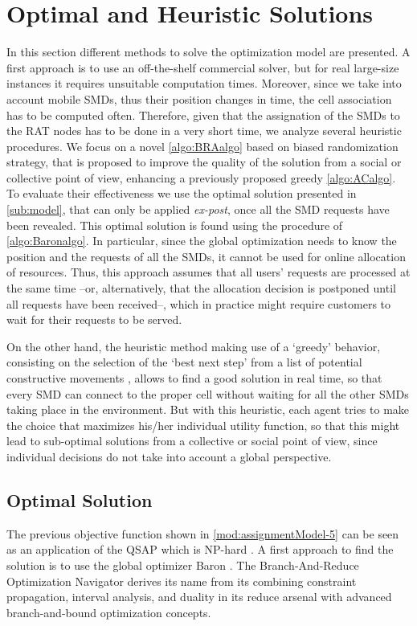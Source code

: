 \documentclass[twoside,openright]{report}
\begin{document}
\section{Optimal and Heuristic Solutions}
\label{sec:methodological_approach}
In this section different methods to solve the optimization model are presented. A first approach is to use an off-the-shelf commercial solver, but for real large-size instances it requires unsuitable computation times.
Moreover, since  we take into account mobile \glspl{SMD}, thus their position changes in time, the cell association has to be computed often. 
Therefore, given that the assignation of the \glspl{SMD} to the \gls{RAT} nodes has to be done in a very short time, we analyze several heuristic procedures.
We focus on a novel \autoref{algo:BRAalgo} based on biased randomization strategy, that is proposed to improve the quality of the solution from a social or collective point of view, enhancing a previously proposed greedy \autoref{algo:ACalgo}.  
To evaluate their  effectiveness we use the optimal solution presented in \autoref{sub:model}, that can only be applied \emph{ex-post}, once all the \gls{SMD} requests have been revealed. This optimal solution is found using the procedure of \autoref{algo:Baronalgo}.
In particular, since the global optimization needs to know the position and the requests of all the \glspl{SMD}, it cannot be used for online allocation of resources. 
Thus, this approach assumes that all users' requests are processed at the same time --or, alternatively, that the allocation decision is postponed until all requests have been received--, which in practice might require customers to wait for their requests to be served. 

On the other hand, the heuristic method making use of a `greedy' behavior, consisting on the selection of the `best next step' from a list of potential constructive movements \cite{Globecom2014}, allows to find a good solution in real time, so that every \gls{SMD} can connect to the proper cell without waiting for all the other \glspl{SMD} taking place in the environment. 
But with this heuristic, each agent tries to make the choice that maximizes his/her individual utility function, so that this might lead to sub-optimal solutions from a collective or social point of view, since individual decisions do not take into account a global perspective.
\subsection{Optimal Solution}
\label{sub:model}
The previous objective function shown in \autoref{mod:assignmentModel-5} can be seen as an application of the \gls{QSAP} which is NP-hard \cite{burkard-2013}. 
A first approach to find the solution is to use the global optimizer Baron \cite{Baron}.  
The Branch-And-Reduce Optimization Navigator derives its name from its combining constraint propagation, interval analysis, and duality in its reduce arsenal with advanced branch-and-bound optimization concepts.
\end{document}
